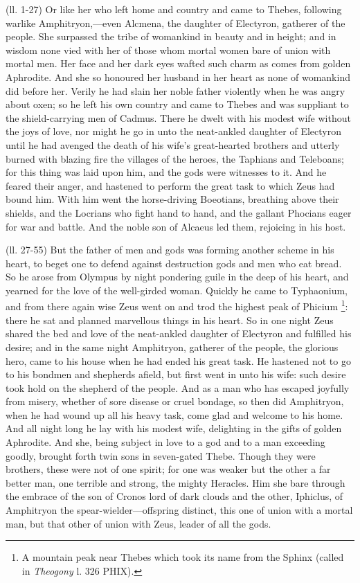 (ll. 1-27) Or like her who left home and country and came to Thebes, following
warlike Amphitryon,—even Alcmena, the daughter of Electyron, gatherer of
the people. She surpassed the tribe of womankind in beauty and in height; and
in wisdom none vied with her of those whom mortal women bare of union with
mortal men. Her face and her dark eyes wafted such charm as comes from golden
Aphrodite. And she so honoured her husband in her heart as none of womankind
did before her. Verily he had slain her noble father violently when he was
angry about oxen; so he left his own country and came to Thebes and was
suppliant to the shield-carrying men of Cadmus. There he dwelt with his modest
wife without the joys of love, nor might he go in unto the neat-ankled daughter
of Electyron until he had avenged the death of his wife’s great-hearted
brothers and utterly burned with blazing fire the villages of the heroes, the
Taphians and Teleboans; for this thing was laid upon him, and the gods were
witnesses to it. And he feared their anger, and hastened to perform the great
task to which Zeus had bound him. With him went the horse-driving Boeotians,
breathing above their shields, and the Locrians who fight hand to hand, and the
gallant Phocians eager for war and battle. And the noble son of Alcaeus led
them, rejoicing in his host.

(ll. 27-55) But the father of men and gods was forming another scheme in his
heart, to beget one to defend against destruction gods and men who eat bread.
So he arose from Olympus by night pondering guile in the deep of his heart, and
yearned for the love of the well-girded woman. Quickly he came to Typhaonium,
and from there again wise Zeus went on and trod the highest peak of Phicium \footnote{A mountain peak near
Thebes which took its name from the Sphinx (called in \emph{Theogony} l.
326 PHIX).}: there he sat and planned
marvellous things in his heart. So in one night Zeus shared the bed and love of
the neat-ankled daughter of Electyron and fulfilled his desire; and in the same
night Amphitryon, gatherer of the people, the glorious hero, came to his house
when he had ended his great task. He hastened not to go to his bondmen and
shepherds afield, but first went in unto his wife: such desire took hold on the
shepherd of the people. And as a man who has escaped joyfully from misery,
whether of sore disease or cruel bondage, so then did Amphitryon, when he had
wound up all his heavy task, come glad and welcome to his home. And all night
long he lay with his modest wife, delighting in the gifts of golden Aphrodite.
And she, being subject in love to a god and to a man exceeding goodly, brought
forth twin sons in seven-gated Thebe. Though they were brothers, these were not
of one spirit; for one was weaker but the other a far better man, one terrible
and strong, the mighty Heracles. Him she bare through the embrace of the son of
Cronos lord of dark clouds and the other, Iphiclus, of Amphitryon the
spear-wielder—offspring distinct, this one of union with a mortal man,
but that other of union with Zeus, leader of all the gods.


